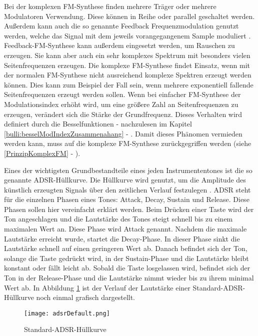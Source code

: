 Bei der komplexen FM-Synthese finden mehrere Träger oder mehrere Modulatoren Verwendung. Diese können in Reihe oder parallel geschaltet werden. Außerdem kann auch die so genannte Feedback Frequenzmodulation genutzt werden, welche das Signal mit dem jeweils vorangegangenem Sample moduliert \cite[S. 399 f.]{hornerPaper}. Feedback-FM-Synthese kann außerdem eingesetzt werden, um Rauschen zu erzeugen. Sie kann aber auch ein sehr komplexes Spektrum mit besonders vielen Seitenfrequenzen erzeugen. Die komplexe FM-Synthese findet Einsatz, wenn mit der normalen FM-Synthese nicht ausreichend komplexe Spektren erzeugt werden können. Dies kann zum Beispiel der Fall sein, wenn mehrere exponentiell fallende Seitenfrequenzen erzeugt werden sollen. Wenn bei einfacher FM-Synthese der Modulationsindex erhöht wird, um eine größere Zahl an Seitenfrequenzen zu erzeugen, verändert sich die Stärke der Grundfrequenz. Dieses Verhalten wird definiert durch die Besselfunktionen - nachzulesen im Kapitel \ref{bulli:besselModIndexZusammenahang} - . Damit dieses Phänomen vermieden werden kann, muss auf die komplexe FM-Synthese zurückgegriffen werden (siehe \ref{PrinzipKomplexFM} - ).

Eines der wichtigsten Grundbestandteile eines jeden Instrumententones ist die so genannte ADSR-Hüllkurve. Die Hüllkurve wird genutzt, um die Amplitude des künstlich erzeugten Signals über den zeitlichen Verlauf festzulegen \cite[S. 532f]{chowningPaper}. ADSR steht für die einzelnen Phasen eines Tones: Attack, Decay, Sustain und Release. Diese Phasen sollen hier vereinfacht erklärt werden. Beim Drücken einer Taste wird der Ton angeschlagen und die Lautstärke des Tones steigt schnell bis zu einem maximalen Wert an. Diese Phase wird Attack genannt. Nachdem die maximale Lautstärke erreicht wurde, startet die Decay-Phase. In dieser Phase sinkt die Lautstärke schnell auf einen geringeren Wert ab. Danach befindet sich der Ton, solange die Taste gedrückt wird, in der Sustain-Phase und die Lautstärke bleibt konstant oder fällt leicht ab. Sobald die Taste losgelassen wird, befindet sich der Ton in der Release-Phase und die Lautstärke nimmt wieder bis zu ihrem minimal Wert ab. In Abbildung \ref{fig:adsrDefault} ist der Verlauf der Lautstärke einer Standard-ADSR-Hüllkurve noch einmal grafisch dargestellt.

\begin{figure} [ht]
\centering
  \texttt{[image: adsrDefault.png]}
\caption{Standard-ADSR-Hüllkurve}
\label{fig:adsrDefault}
\end{figure}

